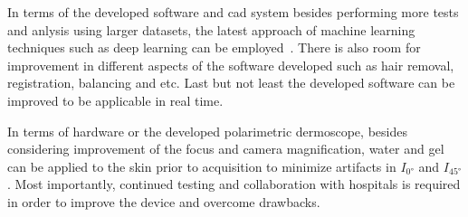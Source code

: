 In terms of the developed software and \ac{cad} system besides performing more tests and anlysis using larger datasets, the latest approach of machine learning techniques such as deep learning can be employed~\cite{premaladha2016novel,codella2015deep}.
There is also room for improvement in different aspects of the software developed such as hair removal, registration, balancing and etc.
Last but not least the developed software can be improved to be applicable in real time.

In terms of hardware or the developed polarimetric dermoscope, besides considering improvement of the focus and camera magnification, water and gel can be applied to the skin prior to acquisition to minimize artifacts in $I_{\ang{0}}$ and $I_{\ang{45}}$.
Most importantly, continued testing and collaboration with hospitals is required in order to improve the device and overcome drawbacks.
%

